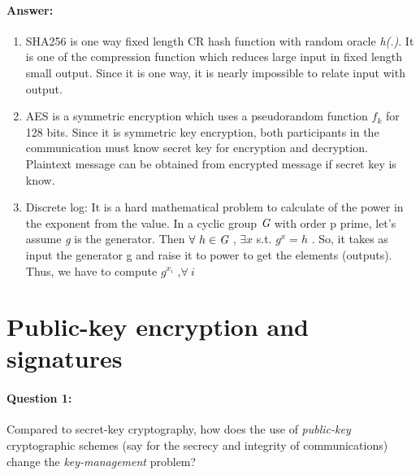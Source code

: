 \documentclass{article}
\begin{document}
    \paragraph{Answer: \newline}
        \begin{enumerate}
            \item SHA256 is one way fixed length CR hash function with random oracle \emph{h(.)}. It is one of the compression function which reduces large input in fixed length small output. Since it is one way, it is nearly impossible to relate input with output.
            \item AES is a symmetric encryption which uses a pseudorandom function $f_k$ for 128 bits. Since it is symmetric key encryption, both participants in the communication must know secret key for encryption and decryption. Plaintext message can be obtained from encrypted message if secret key is know.
            \item Discrete log: It is a hard mathematical problem to calculate of the power in the exponent from the value. In a cyclic group $ \emph{G} $ with order p prime, let's assume \emph{g} is the generator. Then $ \forall \ h \in \emph{G} $  , $ \exists x $ s.t. $ g^x= h $ . So, it takes as input the generator g and raise it to power to get the elements (outputs). Thus, we have to compute $ g^{x_i}$  ,$ \forall \ i $
        \end{enumerate}
        
\section{Public-key encryption and signatures}
    \paragraph{Question 1:} Compared to secret-key cryptography, how does the use of \emph{public-key} cryptographic schemes (say for the secrecy and integrity of communications) change the \emph{key-management} problem?
\end{document}
